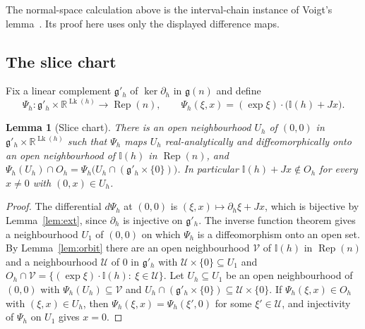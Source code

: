 \documentclass[11pt,a4paper]{article}
\newtheorem{lemma}[theorem]{Lemma}
\theoremstyle{definition}
\theoremstyle{remark}
\numberwithin{equation}{section}
\newcommand{\R}{\mathbb{R}}
\newcommand{\Rep}{\operatorname{Rep}}
\newcommand{\I}{\mathbb I}
\newcommand{\g}{\mathfrak g}
\newcommand{\Lk}{\operatorname{Lk}}
\begin{document}
The normal-space calculation above is the interval-chain instance of Voigt's lemma~\cite{voigt}. Its proof here uses only the displayed difference maps.

\subsection{The slice chart}
Fix a linear complement $\g'_h$ of $\ker\partial_h$ in $\g(n)$ and define
\[
\Psi_h:\g'_h\times\R^{\Lk(h)}\to\Rep(n),\qquad\Psi_h(\xi,x)=(\exp\xi)\cdot\bigl(\I(h)+Jx\bigr).
\]

\begin{lemma}[Slice chart]\label{lem:slice}
There is an open neighbourhood $U_h$ of $(0,0)$ in $\g'_h\times\R^{\Lk(h)}$ such that $\Psi_h$ maps $U_h$ real-analytically and diffeomorphically onto an open neighbourhood of $\I(h)$ in $\Rep(n)$, and $\Psi_h(U_h)\cap O_h=\Psi_h\bigl(U_h\cap(\g'_h\times\{0\})\bigr)$. In particular $\I(h)+Jx\notin O_h$ for every $x\neq0$ with $(0,x)\in U_h$.
\end{lemma}
\begin{proof}
The differential $d\Psi_h$ at $(0,0)$ is $(\xi,x)\mapsto\partial_h\xi+Jx$, which is bijective by Lemma~\ref{lem:ext}, since $\partial_h$ is injective on $\g'_h$. The inverse function theorem gives a neighbourhood $U_1$ of $(0,0)$ on which $\Psi_h$ is a diffeomorphism onto an open set. By Lemma~\ref{lem:orbit} there are an open neighbourhood $\mathcal V$ of $\I(h)$ in $\Rep(n)$ and a neighbourhood $\mathcal U$ of $0$ in $\g'_h$ with $\mathcal U\times\{0\}\subseteq U_1$ and $O_h\cap\mathcal V=\{(\exp\xi)\cdot\I(h):\ \xi\in\mathcal U\}$. Let $U_h\subseteq U_1$ be an open neighbourhood of $(0,0)$ with $\Psi_h(U_h)\subseteq\mathcal V$ and $U_h\cap(\g'_h\times\{0\})\subseteq\mathcal U\times\{0\}$. If $\Psi_h(\xi,x)\in O_h$ with $(\xi,x)\in U_h$, then $\Psi_h(\xi,x)=\Psi_h(\xi',0)$ for some $\xi'\in\mathcal U$, and injectivity of $\Psi_h$ on $U_1$ gives $x=0$.
\end{proof}
\end{document}
